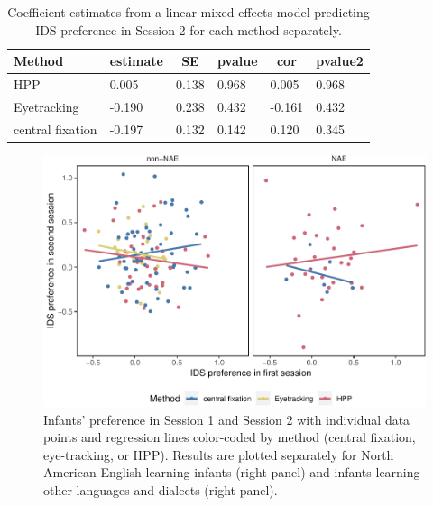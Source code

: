 \documentclass[
  man,floatsintext]{apa6}
\begin{document}
\begin{table}[tbp]

\begin{center}
\begin{threeparttable}

\caption{\label{tab:unnamed-chunk-6}Coefficient estimates from a linear mixed effects model predicting IDS preference in Session 2 for each method separately.}

\begin{tabular}{llllll}
\toprule
Method & \multicolumn{1}{c}{estimate} & \multicolumn{1}{c}{SE} & \multicolumn{1}{c}{pvalue} & \multicolumn{1}{c}{cor} & \multicolumn{1}{c}{pvalue2}\\
\midrule
HPP & 0.005 & 0.138 & 0.968 & 0.005 & 0.968\\
Eyetracking & -0.190 & 0.238 & 0.432 & -0.161 & 0.432\\
central fixation & -0.197 & 0.132 & 0.142 & 0.120 & 0.345\\
\bottomrule
\end{tabular}

\end{threeparttable}
\end{center}

\end{table}

\begin{figure}
\centering
\includegraphics{Retest_current_draft_files/figure-latex/fig1-1.pdf}
\caption{\label{fig:fig1}Infants' preference in Session 1 and Session 2 with individual data points and regression lines color-coded by method (central fixation, eye-tracking, or HPP). Results are plotted separately for North American English-learning infants (right panel) and infants learning other languages and dialects (right panel).}
\end{figure}
\end{document}
